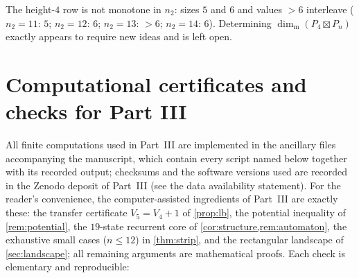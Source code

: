 \documentclass[11pt]{amsart}
\theoremstyle{remark}
\newcommand{\mdim}{\operatorname{dim}_{\mathrm m}}
\begin{document}
The height-$4$ row is not monotone in $n_2$: sizes $5$ and $6$ and values ${>}6$ interleave ($n_2=11$: $5$; $n_2=12$: $6$; $n_2=13$: ${>}6$; $n_2=14$: $6$).  Determining $\mdim(P_4\boxtimes P_n)$ exactly appears to require new ideas and is left open.

\section{Computational certificates and checks for Part III}\label{sec:verification}

All finite computations used in Part~III are implemented in the ancillary files accompanying the manuscript, which contain every script named below together with its recorded output; checksums and the software versions used are recorded in the Zenodo deposit of Part~III (see the data availability statement).  For the reader's convenience, the computer-assisted ingredients of Part~III are exactly these: the transfer certificate $V_5=V_4+1$ of \cref{prop:lb}, the potential inequality of \cref{rem:potential}, the $19$-state recurrent core of \cref{cor:structure,rem:automaton}, the exhaustive small cases ($n\le 12$) in \cref{thm:strip}, and the rectangular landscape of \cref{sec:landscape}; all remaining arguments are mathematical proofs.  Each check is elementary and reproducible:
\end{document}
